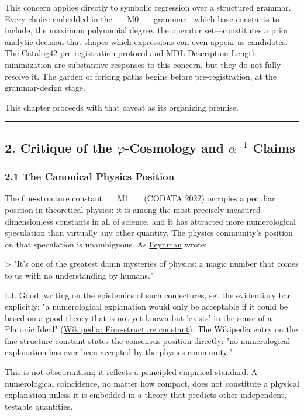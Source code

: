 This concern applies directly to symbolic regression over a structured grammar. Every choice embedded in the \_\_M0\_\_ grammar---which base constants to include, the maximum polynomial degree, the operator set---constitutes a prior analytic decision that shapes which expressions can even appear as candidates. The Catalog42 pre-registration protocol and MDL Description Length minimization are substantive responses to this concern, but they do not fully resolve it. The garden of forking paths begins before pre-registration, at the grammar-design stage.

This chapter proceeds with that caveat as its organizing premise.

\noindent\rule{\textwidth}{0.4pt}

\subsection{2. Critique of the $\varphi$-Cosmology and $\alpha^{-1}$ Claims}

\subsubsection{2.1 The Canonical Physics Position}

The fine-structure constant \_\_M1\_\_ (\href{https://en.wikipedia.org/wiki/Fine-structure\_constant}{CODATA 2022}) occupies a peculiar position in theoretical physics: it is among the most precisely measured dimensionless constants in all of science, and it has attracted more numerological speculation than virtually any other quantity. The physics community's position on that speculation is unambiguous. As \href{https://en.wikipedia.org/wiki/Fine-structure\_constant}{Feynman} wrote:

> "It's one of the greatest damn mysteries of physics: a magic number that comes to us with no understanding by humans."

I.J. Good, writing on the epistemics of such conjectures, set the evidentiary bar explicitly: "a numerological explanation would only be acceptable if it could be based on a good theory that is not yet known but 'exists' in the sense of a Platonic Ideal" (\href{https://en.wikipedia.org/wiki/Fine-structure\_constant}{Wikipedia: Fine-structure constant}). The Wikipedia entry on the fine-structure constant states the consensus position directly: "no numerological explanation has ever been accepted by the physics community."

This is not obscurantism; it reflects a principled empirical standard. A numerological coincidence, no matter how compact, does not constitute a physical explanation unless it is embedded in a theory that predicts other independent, testable quantities.

